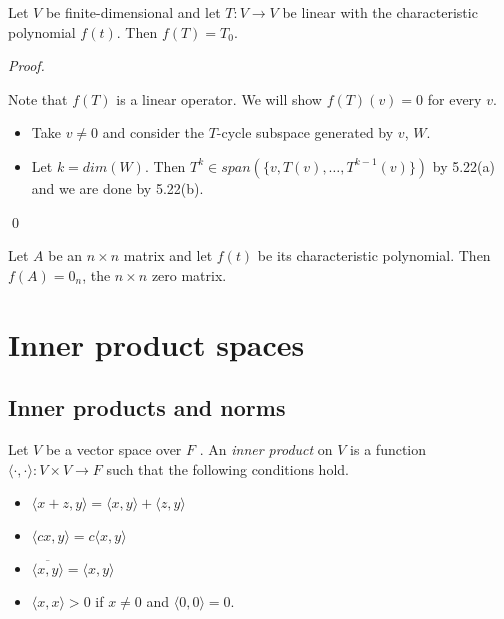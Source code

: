 \documentclass[12pt]{article}
\newenvironment{theorem}[2][Theorem]{\begin{trivlist}
\item[\hskip \labelsep {\bfseries #1}\hskip \labelsep {\bfseries #2.}]}{\end{trivlist}}
\newenvironment{corollary}[2][Corollary]{\begin{trivlist}
\item[\hskip \labelsep {\bfseries #1}\hskip \labelsep {\bfseries #2}]}{\end{trivlist}}
\newenvironment{definition}[2][Definition]{\begin{trivlist}
\item[\hskip \labelsep {\bfseries #1}\hskip \labelsep {\bfseries #2}]}{\end{trivlist}}
\newenvironment{sol}
    {\emph{Proof.}
    }
    {
    \qed
    }
\begin{document}
\begin{theorem}{5.23, Cayley-Hamilton}
Let $V$ be finite-dimensional and let $T : V \to V$ be linear with the characteristic polynomial $f(t)$. Then $f(T) = T_0$.
\end{theorem}

\begin{sol}
Note that $f(T)$ is a linear operator. We will show $f(T)(v) = 0$ for every $v$.

\begin{itemize}
    \item Take $v \neq 0$ and consider the $T$-cycle subspace generated by $v$, $W$.
    
    \item Let $k = dim(W)$. Then $T^k \in span(\{v, T(v), \dots, T^{k-1}(v)\})$ by 5.22(a) and we are done by 5.22(b).
\end{itemize}
\end{sol}

\begin{corollary}{15}
Let $A$ be an $n \times n$ matrix and let $f(t)$ be its characteristic polynomial. Then $f(A) = 0_n$, the $n \times n$ zero matrix.
\end{corollary}

\section{Inner product spaces}

\subsection{Inner products and norms}

\begin{definition}{1}
Let $V$ be a vector space over $F$ . An \textit{inner product} on $V$ is a function $\langle \cdot, \cdot \rangle : V \times V \to F$ such that the following conditions hold. 
\begin{itemize}
    \item $\langle x + z, y \rangle = \langle x, y \rangle + \langle z,y \rangle$
    
    \item $\langle cx, y \rangle = c\langle x, y \rangle$
    
    \item $\overline{\langle x, y \rangle} = \langle x, y \rangle$
    
    \item $\langle x, x \rangle > 0$ if $x \neq 0$ and $\langle 0, 0 \rangle = 0$.
\end{itemize}
\end{definition}
\end{document}
